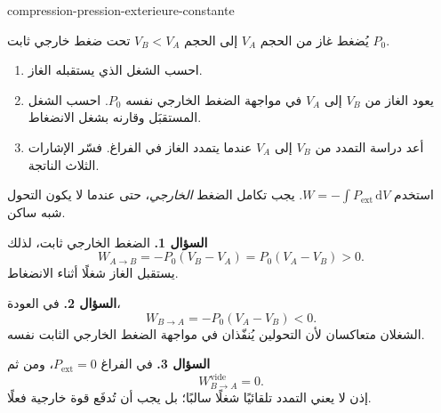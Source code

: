 \begin{exo}{compression-pression-exterieure-constante}

يُضغط غاز من الحجم $V_A$ إلى الحجم $V_B<V_A$ تحت ضغط خارجي ثابت $P_0$.

\begin{enumerate}
\item احسب الشغل الذي يستقبله الغاز.
\item يعود الغاز من $V_B$ إلى $V_A$ في مواجهة الضغط الخارجي نفسه $P_0$. احسب الشغل المستقبَل وقارنه بشغل الانضغاط.
\item أعد دراسة التمدد من $V_B$ إلى $V_A$ عندما يتمدد الغاز في الفراغ. فسّر الإشارات الثلاث الناتجة.
\end{enumerate}

\begin{indication}
استخدم $W=-\int P_{\mathrm{ext}}\,\mathrm{d}V$. يجب تكامل الضغط
\emph{الخارجي}، حتى عندما لا يكون التحول شبه ساكن.
\end{indication}

\begin{solution}
\textbf{السؤال 1.} الضغط الخارجي ثابت، لذلك
\[
W_{A\to B}=-P_0(V_B-V_A)=P_0(V_A-V_B)>0.
\]
يستقبل الغاز شغلًا أثناء الانضغاط.

\textbf{السؤال 2.} في العودة،
\[
W_{B\to A}=-P_0(V_A-V_B)<0.
\]
الشغلان متعاكسان لأن التحولين يُنفّذان في مواجهة الضغط الخارجي الثابت نفسه.

\textbf{السؤال 3.} في الفراغ $P_{\mathrm{ext}}=0$، ومن ثم
\[
W_{B\to A}^{\mathrm{vide}}=0.
\]
إذن لا يعني التمدد تلقائيًا شغلًا سالبًا؛ بل يجب أن تُدفَع قوة خارجية فعلًا.
\end{solution}
\end{exo}
